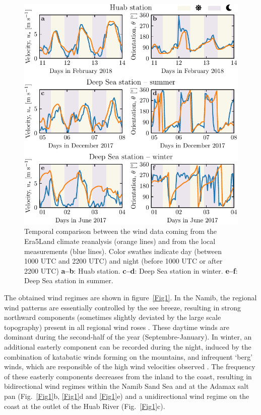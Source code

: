   \begin{figure}
    \centering
    \includegraphics[scale=1]{Figures/Figure2.pdf}
    \caption{Temporal comparison between the wind data coming from the Era5Land climate reanalysis (orange lines) and from the local measurements (blue lines). Color swathes indicate day (between 1000 UTC and 2200 UTC) and night (before 1000 UTC or after 2200 UTC) \textbf{a--b}: Huab station. \textbf{c--d}: Deep Sea station in winter. \textbf{e--f}: Deep Sea station in summer.}
    \label{Fig2}
  \end{figure}

  The obtained wind regimes are shown in figure~\ref{Fig1}. In the Namib, the regional wind patterns are essentially controlled by the see breeze, resulting in strong northward components (sometimes slightly deviated by the large scale topography) present in all regional wind roses \citep{lancaster1985}. These daytime winds are dominant during the second-half of the year (Septembre-January). In winter, an additional easterly component can be recorded during the night, induced by the combination of katabatic winds forming on the mountains, and infrequent `berg' winds, which are responsible of the high wind velocities observed \citep{lancaster1984}. The frequency of these easterly components decreases from the inland to the coast, resulting in bidirectional wind regimes within the Namib Sand Sea and at the Adamax salt pan (Fig.~\ref{Fig1}b, \ref{Fig1}d and \ref{Fig1}e) and a unidirectional wind regime on the coast at the outlet of the Huab River (Fig.~\ref{Fig1}c).

